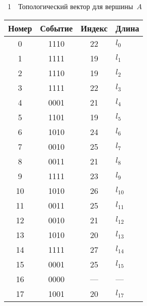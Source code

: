 \begin{multicols}{2}
\addtocounter{figure}{1}


\noindent
\begin{center}
\vspace*{1pt}
\parbox{60mm}{{{\tablename~1}\ \ \small{Топологический вектор для вершины~$A$}}}

\vspace*{2ex}
{\small 
\tabcolsep=6pt
\begin{tabular}{|c|c|c|l|}
\hline
Номер&Событие&Индекс&\multicolumn{1}{c|}{Длина}\\
\hline
\hphantom{9}0&1110&22&\hspace*{3mm}$l_0$\\
\hphantom{9}1&1111&19&\hspace*{3mm}$l_1$\\
\hphantom{9}2&1110&19&\hspace*{3mm}$l_2$\\
\hphantom{9}3&1111&22&\hspace*{3mm}$l_3$\\
\hphantom{9}4&0001&21&\hspace*{3mm}$l_4$\\
\hphantom{9}5&1101&19&\hspace*{3mm}$l_5$\\
\hphantom{9}6&1010&24&\hspace*{3mm}$l_6$\\
\hphantom{9}7&0010&25&\hspace*{3mm}$l_7$\\
\hphantom{9}8&0011&21&\hspace*{3mm}$l_8$\\
\hphantom{9}9&1111&23&\hspace*{3mm}$l_9$\\
10&1010&26&\hspace*{3mm}$l_{10}$\\
11&0011&25&\hspace*{3mm}$l_{11}$\\
12&0010&21&\hspace*{3mm}$l_{12}$\\
13&1010&20&\hspace*{3mm}$l_{13}$\\
14&1111&27&\hspace*{3mm}$l_{14}$\\
15&0001&25&\hspace*{3mm}$l_{15}$\\
16&0000&---&\hspace*{3mm}---\\
17&1001&20&\hspace*{3mm}$l_{17}$\\
\hline
\end{tabular}
}
\end{center}


\end{multicols}
